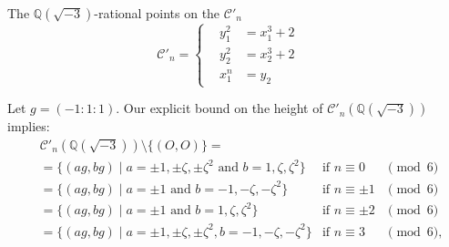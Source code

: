 \documentclass[handout]{beamer}
\newcommand{\qe}{\mathbb{Q}}
\newcommand{\Ci}{\mathcal{C}}
\begin{document}
  \begin{frame}{ The  $\qe(\sqrt{-3})$-rational points on the  $\Ci'_n$ }
\begin{equation*}
\mathcal{C}'_n=\begin{cases}
\,\,\,\,\,y_1^2&=x_1^3+2\,\,\,\,\,\,\,\,\\
\,\,\,\,\,y_2^2&=x_2^3+2\,\,\,\,\,\,\,\,\\
\,\,\,\,\,x_1^n&=y_2
\end{cases}
\end{equation*}

 \begin{alertblock}{Let $g=(-1:1:1)$. Our explicit bound on the height of $\Ci'_n(\qe(\sqrt{-3}))$  implies:}   
     \begin{align*}
	&\Ci'_n(\qe(\sqrt{-3}))\setminus\{(O,O)\} = & & \\
	&=\{(a g, b g)\mid a=\pm 1, \pm \zeta, \pm \zeta^2\text{ and }b=1,\zeta,\zeta^2\}	&\text{if }n\equiv 0&\pmod 6\\
	&=\{(a g, b g)\mid a=\pm 1\text{ and }b=-1,-\zeta,-\zeta^2\}	&\text{if }n\equiv \pm 1&\pmod 6\\
	&=\{(a g, b g)\mid a=\pm 1\text{ and }b=1,\zeta,\zeta^2\}	&\text{if }n\equiv \pm 2&\pmod 6\\
	&=\{(a g, b g)\mid a=\pm 1, \pm \zeta, \pm \zeta^2, b=-1,-\zeta,-\zeta^2\}	&\text{if }n\equiv 3&\pmod 6,
     \end{align*}
 \end{alertblock}
 \end{frame}
\end{document}
